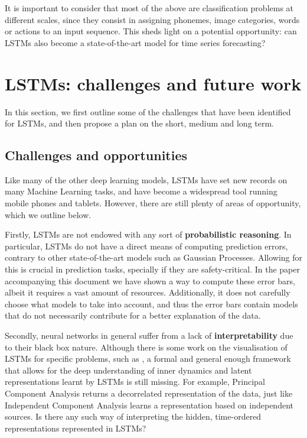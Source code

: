 \documentclass[pdftex,12pt,a4paper]{article}
\theoremstyle{definition}
\theoremstyle{remark}
\begin{document}
\par It is important to consider that most of the above are classification problems at different scales, since they consist in assigning phonemes, image categories, words or actions to an input sequence. This sheds light on a potential opportunity: can LSTMs also become a state-of-the-art model for time series forecasting?

\section{LSTMs: challenges and future work} \label{sub_future}
In this section, we first outline some of the challenges that have been identified for LSTMs, and then propose a plan on the short, medium and long term.

\subsection{Challenges and opportunities}
Like many of the other deep learning models, LSTMs have set new records on many Machine Learning tasks, and have become a widespread tool running mobile phones and tablets. However, there are still plenty of areas of opportunity, which we outline below.

\par Firstly, LSTMs are not endowed with any sort of \textbf{probabilistic reasoning}. In particular, LSTMs do not have a direct means of computing prediction errors, contrary to other state-of-the-art models such as Gaussian Processes. Allowing for this is crucial in prediction tasks, specially if they are safety-critical. In the paper accompanying this document we have shown a way to compute these error bars, albeit it requires a vast amount of resources. Additionally, it does not carefully choose what models to take into account, and thus the error bars contain models that do not necessarily contribute for a better explanation of the data.

\par Secondly, neural networks in general suffer from a lack of \textbf{interpretability} due to their black box nature. Although there is some work on the visualisation of LSTMs for specific problems, such as \cite{Karpathy2016}, a formal and general enough framework that allows for the deep understanding of inner dynamics and latent representations learnt by LSTMs is still missing. For example, Principal Component Analysis returns a decorrelated representation of the data, just like Independent Component Analysis learns a representation based on independent sources. Is there any such way of interpreting the hidden, time-ordered representations represented in LSTMs?
\end{document}
